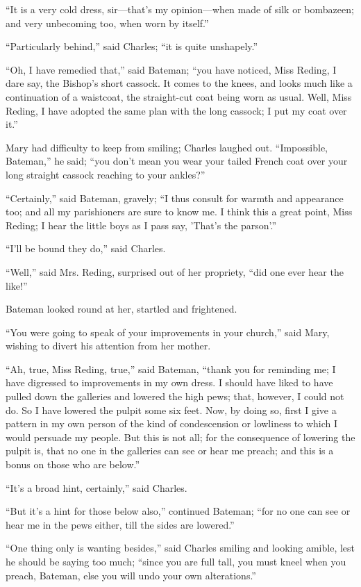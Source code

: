 ``It is a very cold dress, sir—that's my opinion—when made
of silk or bombazeen; and very unbecoming too, when worn by
itself.''

``Particularly behind,'' said Charles; ``it is quite
unshapely.''

``Oh, I have remedied that,'' said Bateman; ``you have
noticed, Miss Reding, I dare say, the Bishop's short cassock. It comes
to the knees, and looks much like a continuation of a waistcoat, the
straight-cut coat being worn as usual. Well, Miss Reding, I have
adopted the same plan with the long cassock; I put my coat over
it.''

Mary had difficulty to keep from smiling; Charles laughed out.
``Impossible, Bateman,'' he said; ``you don't mean you
wear your tailed French coat over your long straight cassock reaching
to your ankles?''

``Certainly,'' said Bateman, gravely; ``I thus consult
for warmth and appearance too; and all my parishioners are sure to
know me. I think this a great point, Miss Reding; I hear the little
boys as I pass say, 'That's the parson'.''

``I'll be bound they do,'' said Charles.

``Well,'' said Mrs. Reding, surprised out of her propriety,
``did one ever hear the like!''

Bateman looked round at her, startled and frightened.

``You were going to speak of your improvements in your
church,'' said Mary, wishing to divert his attention from her
mother.

``Ah, true, Miss Reding, true,'' said Bateman, ``thank
you for reminding me; I have digressed to improvements in my own
dress. I should have liked to have pulled down the galleries and
lowered the high pews; that, however, I could not do. So I have
lowered the pulpit some six feet. Now, by doing so, first I give a
pattern in my own person of the kind of condescension or lowliness to
which I would persuade my people. But this is not all; for the
consequence of lowering the pulpit is, that no one in the galleries
can see or hear me preach; and this is a bonus on those who are
below.''

``It's a broad hint, certainly,'' said Charles.

``But it's a hint for those below also,'' continued
Bateman; ``for no one can see or hear me in the pews either, till
the sides are lowered.''

``One thing only is wanting besides,'' said Charles smiling
and looking amible, lest he should be saying too much; ``since you
are full tall, you must kneel when you preach, Bateman, else you will
undo your own alterations.''

